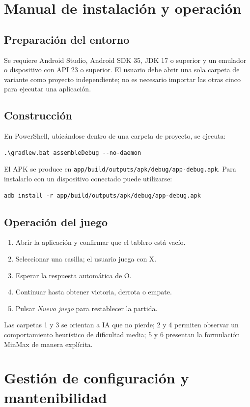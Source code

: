 \documentclass[stu,a4paper,12pt,floatsintext]{apa7}
\begin{document}
\section{Manual de instalación y operación}
\subsection{Preparación del entorno}
Se requiere Android Studio, Android SDK 35, JDK 17 o superior y un emulador
o dispositivo con API 23 o superior. El usuario debe abrir una sola carpeta de
variante como proyecto independiente; no es necesario importar las otras cinco
para ejecutar una aplicación.

\subsection{Construcción}
En PowerShell, ubicándose dentro de una carpeta de proyecto, se ejecuta:
\begin{lstlisting}[basicstyle=\ttfamily\small,frame=single]
.\gradlew.bat assembleDebug --no-daemon
\end{lstlisting}
El APK se produce en
\texttt{app/build/outputs/apk/debug/app-debug.apk}. Para instalarlo con un
dispositivo conectado puede utilizarse:
\begin{lstlisting}[basicstyle=\ttfamily\small,frame=single]
adb install -r app/build/outputs/apk/debug/app-debug.apk
\end{lstlisting}

\subsection{Operación del juego}
\begin{enumerate}
  \item Abrir la aplicación y confirmar que el tablero está vacío.
  \item Seleccionar una casilla; el usuario juega con X.
  \item Esperar la respuesta automática de O.
  \item Continuar hasta obtener victoria, derrota o empate.
  \item Pulsar \textit{Nuevo juego} para restablecer la partida.
\end{enumerate}
Las carpetas 1 y 3 se orientan a IA que no pierde; 2 y 4 permiten observar
un comportamiento heurístico de dificultad media; 5 y 6 presentan la
formulación MinMax de manera explícita.

\section{Gestión de configuración y mantenibilidad}
\end{document}
